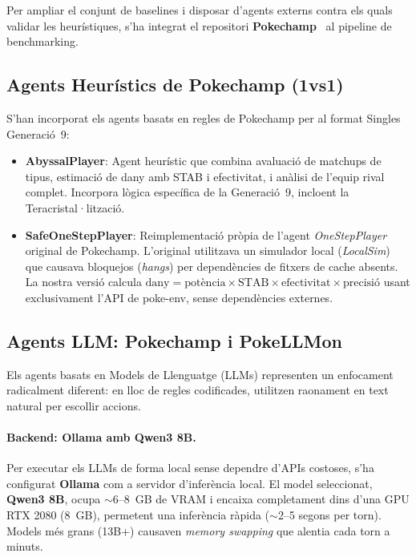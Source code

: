 Per ampliar el conjunt de baselines i disposar d'agents externs contra els quals validar les heurístiques, s'ha integrat el repositori \textbf{Pokechamp}~\cite{pokechamp} al pipeline de benchmarking.

\subsection{Agents Heurístics de Pokechamp (1vs1)}

S'han incorporat els agents basats en regles de Pokechamp per al format Singles Generació~9:

\begin{itemize}
    \item \textbf{AbyssalPlayer}: Agent heurístic que combina avaluació de matchups de tipus, estimació de dany amb STAB i efectivitat, i anàlisi de l'equip rival complet. Incorpora lògica específica de la Generació~9, incloent la Teracristal·lització.
    \item \textbf{SafeOneStepPlayer}: Reimplementació pròpia de l'agent \textit{OneStepPlayer} original de Pokechamp. L'original utilitzava un simulador local (\textit{LocalSim}) que causava bloquejos (\textit{hangs}) per dependències de fitxers de cache absents. La nostra versió calcula $\text{dany} = \text{potència} \times \text{STAB} \times \text{efectivitat} \times \text{precisió}$ usant exclusivament l'API de poke-env, sense dependències externes.
\end{itemize}

\subsection{Agents LLM: Pokechamp i PokeLLMon}
\label{subsec:llm_impl}

Els agents basats en Models de Llenguatge (LLMs) representen un enfocament radicalment diferent: en lloc de regles codificades, utilitzen raonament en text natural per escollir accions.

\paragraph{Backend: Ollama amb Qwen3 8B.}
Per executar els LLMs de forma local sense dependre d'APIs costoses, s'ha configurat \textbf{Ollama} com a servidor d'inferència local. El model seleccionat, \textbf{Qwen3 8B}, ocupa $\sim$6--8~GB de VRAM i encaixa completament dins d'una GPU RTX 2080 (8~GB), permetent una inferència ràpida ($\sim$2--5 segons per torn). Models més grans (13B+) causaven \textit{memory swapping} que alentia cada torn a minuts.

